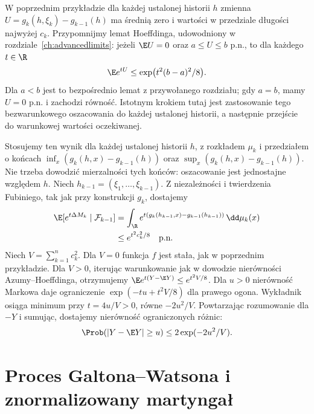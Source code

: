 \begin{uwaga}
W poprzednim przykładzie dla każdej ustalonej
historii $h$ zmienna $U=g_k(h,\xi_k)-g_{k-1}(h)$
ma średnią zero i wartości w przedziale
długości najwyżej $c_k$. Przypomnijmy lemat
Hoeffdinga, udowodniony w rozdziale~\ref{ch:advancedlimits}:
jeżeli $\E U=0$ oraz $a\leq U\leq b$ p.n.,
to dla każdego $t\in\R$
\[
\E e^{tU}\leq\exp\bigl(t^2(b-a)^2/8\bigr).
\]
Dla $a<b$ jest to bezpośrednio lemat
z przywołanego rozdziału; gdy $a=b$,
mamy $U=0$ p.n. i zachodzi równość.
Istotnym krokiem tutaj jest zastosowanie
tego bezwarunkowego oszacowania do każdej
ustalonej historii, a następnie przejście
do warunkowej wartości oczekiwanej.

Stosujemy ten wynik dla każdej ustalonej historii
$h$, z rozkładem $\mu_k$ i przedziałem o końcach
$\inf_x(g_k(h,x)-g_{k-1}(h))$ oraz
$\sup_x(g_k(h,x)-g_{k-1}(h))$.
Nie trzeba dowodzić mierzalności tych końców:
oszacowanie jest jednostajne względem $h$.
Niech $h_{k-1}=(\xi_1,\ldots,\xi_{k-1})$.
Z niezależności i twierdzenia Fubiniego,
tak jak przy konstrukcji $g_k$, dostajemy
\[
\begin{aligned}
\E[e^{t\Delta M_k}\mid\mathcal F_{k-1}]
&=\int_\R e^{t(g_k(h_{k-1},x)-g_{k-1}(h_{k-1}))}\,
\dd\mu_k(x)\\
&\leq e^{t^2c_k^2/8}\quad\text{p.n.}
\end{aligned}
\]
Niech $V=\sum_{k=1}^nc_k^2$. Dla $V=0$
funkcja $f$ jest stała, jak w poprzednim przykładzie.
Dla $V>0$, iterując warunkowanie jak w dowodzie
nierówności Azumy--Hoeffdinga, otrzymujemy
$\E e^{t(Y-\E Y)}\leq e^{t^2V/8}$.
Dla $u>0$ nierówność Markowa daje ograniczenie
$\exp(-tu+t^2V/8)$ dla prawego ogona.
Wykładnik osiąga minimum przy $t=4u/V>0$,
równe $-2u^2/V$.
Powtarzając rozumowanie dla $-Y$ i sumując,
dostajemy nierówność ograniczonych różnic:
\[
\Prob(|Y-\E Y|\geq u)
\leq2\exp(-2u^2/V).
\]
\end{uwaga}

\section{Proces Galtona--Watsona i znormalizowany martyngał}

